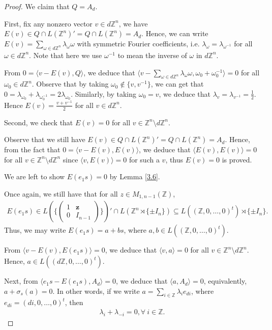 \documentclass[12pt]{amsart}
\theoremstyle{definition}
\theoremstyle{remark}
\begin{document}
\begin{proof}
We claim that $Q=A_d$. 

First, fix any nonzero vector $v\in d\mathbb{Z}^n$, we have $E(v)\in Q\cap L(\mathbb{Z}^n)'=Q\cap L(\mathbb{Z}^n)=A_d$. Hence, we can write $E(v)=\sum\limits_{\omega\in d\mathbb{Z}^n}\lambda_{\omega}\omega$ with symmetric Fourier coefficients, i.e. $\lambda_{\omega}=\lambda_{\omega^{-1}}$ for all $\omega\in d\mathbb{Z}^n$. Note that here we use $\omega^{-1}$ to mean the inverse of $\omega$ in $d\mathbb{Z}^n$.

From $0=\langle v-E(v), Q \rangle$, we deduce that $\langle v-\sum\limits_{\omega\in d\mathbb{Z}^n}\lambda_{\omega}\omega, \omega_0+\omega_{0}^{-1} \rangle=0$ for all $\omega_0\in d\mathbb{Z}^n$. Observe that by taking $\omega_0\not\in\{v, v^{-1}\}$, we can get that $0=\lambda_{\omega_0}+\lambda_{\omega_0^{-1}}=2\lambda_{\omega_0}.$ Similarly, by taking $\omega_0=v$, we deduce that $\lambda_{v}=\lambda_{v^{-1}}=\frac{1}{2}$. Hence $E(v)=\frac{v+v^{-1}}{2}$ for all $v\in d\mathbb{Z}^n$.

Second, we check that $E(v)=0$ for all $v\in\mathbb{Z}^n\setminus {d\mathbb{Z}^n}$.

Observe that we still have $E(v)\in Q\cap L(\mathbb{Z}^n)'=Q\cap L(\mathbb{Z}^n)=A_d$. Hence, from the fact that $0=\langle v-E(v), E(v) \rangle$, we deduce that $\langle E(v), E(v)\rangle=0$ for all $v\in \mathbb{Z}^n\setminus {d\mathbb{Z}^n}$ since $\langle v, E(v) \rangle=0$ for such a $v$, thus $E(v)=0$ is proved.

We are left to show $E(e_1s)=0$ by Lemma \ref{3.6}. 

Once again, we still have that for all $z\in M_{1, n-1}(\mathbb{Z})$,
\begin{align*}
E(e_1s)\in L(\{\left(\begin{smallmatrix}
1&\boldsymbol{z}\\
0&I_{n-1}
\end{smallmatrix}\right) \})'\cap L(\mathbb{Z}^n\rtimes \{\pm I_{n}\})\subseteq L((\mathbb{Z},0,\dots, 0)^t)\rtimes \{\pm I_{n}\}.
\end{align*}
Thus, we may write $E(e_1s)=a+bs$, where $a, b\in L((\mathbb{Z},0,\dots, 0)^t)$.

From $\langle v-E(v), E(e_1s)\rangle=0$, we deduce that $\langle v, a \rangle=0$ for all $v\in \mathbb{Z}^n\setminus {d\mathbb{Z}^n}$. Hence, $a\in L((d\mathbb{Z},0,\dots,0)^t)$.

Next, from $\langle e_1s-E(e_1s), A_d \rangle=0$, we deduce that $\langle a, A_d \rangle=0$, equivalently, $a+\sigma_s(a)=0$. In other words, if we write $a=\sum_{i\in\mathbb{Z}}\lambda_ie_{di}$, where $e_{di}=(di,0,\ldots, 0)^t$, then 
\begin{align}\label{eq: skew-symmetry on the coefficients of a}
\lambda_i+\lambda_{-i}=0,\forall~i\in\mathbb{Z}. 
\end{align}


\end{proof}
\end{document}
